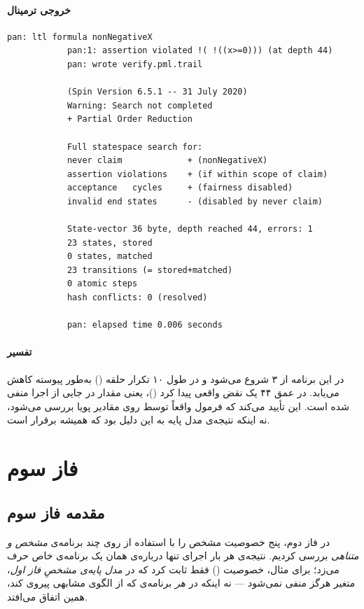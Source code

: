 \documentclass[12pt]{report}
\begin{document}
	\subsubsection{خروجی ترمینال}
	\begin{latin}
		\begin{lstlisting}[style=termstyle]
			pan: ltl formula nonNegativeX
			pan:1: assertion violated !( !((x>=0))) (at depth 44)
			pan: wrote verify.pml.trail
			
			(Spin Version 6.5.1 -- 31 July 2020)
			Warning: Search not completed
			+ Partial Order Reduction
			
			Full statespace search for:
			never claim             + (nonNegativeX)
			assertion violations    + (if within scope of claim)
			acceptance   cycles     + (fairness disabled)
			invalid end states      - (disabled by never claim)
			
			State-vector 36 byte, depth reached 44, errors: 1
			23 states, stored
			0 states, matched
			23 transitions (= stored+matched)
			0 atomic steps
			hash conflicts: 0 (resolved)
			
			pan: elapsed time 0.006 seconds
		\end{lstlisting}
	\end{latin}
	
	\subsubsection{تفسیر}
	در این برنامه  از ۳ شروع می‌شود و در طول ۱۰ تکرار حلقه () به‌طور پیوسته کاهش می‌یابد.  در عمق ۴۴ یک نقض واقعی پیدا کرد ()، یعنی مقدار  در جایی از اجرا منفی شده است. این تأیید می‌کند که فرمول  واقعاً توسط  روی مقادیر پویا بررسی می‌شود، نه اینکه نتیجه‌ی مدل پایه به این دلیل بود که  همیشه برقرار است.
	
	\chapter*{فاز سوم}
	
	\section{مقدمه فاز سوم}
	
	در فاز دوم، پنج خصوصیت مشخص را با استفاده از  روی چند برنامه‌ی \emph{مشخص و متناهی}  بررسی کردیم. نتیجه‌ی هر بار اجرای  تنها درباره‌ی همان یک برنامه‌ی خاص حرف می‌زد؛ برای مثال، خصوصیت  () فقط ثابت کرد که در \emph{مدل پایه‌ی مشخصِ فاز اول}، متغیر  هرگز منفی نمی‌شود --- نه اینکه در \emph{هر} برنامه‌ی  که از الگوی مشابهی پیروی کند، همین اتفاق می‌افتد.
	
\end{document}
